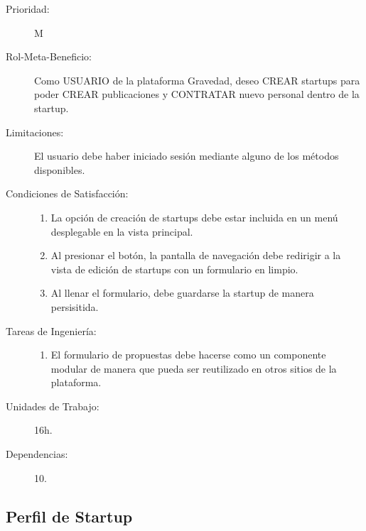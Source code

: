 \begin{description}
    \item[Prioridad:] M
    \item[Rol-Meta-Beneficio:]  Como USUARIO de la plataforma Gravedad, deseo CREAR startups para poder CREAR publicaciones y CONTRATAR nuevo personal dentro de la startup.
    \item[Limitaciones:]  El usuario debe haber iniciado sesión mediante alguno de los métodos disponibles.
    \item[Condiciones de Satisfacción:]  \hfill
        \begin{enumerate}
            \item La opción de creación de startups debe estar incluida en un menú desplegable en la vista principal.
    		\item Al presionar el botón, la pantalla de navegación debe redirigir a la vista de edición de startups con un formulario en limpio.
    		\item Al llenar el formulario, debe guardarse la startup de manera persisitida.
        \end{enumerate}
    \item[Tareas de Ingeniería:]  \hfill
        \begin{enumerate}
            \item El formulario de propuestas debe hacerse como un componente modular de manera que pueda ser reutilizado en otros sitios de la plataforma.
        \end{enumerate}
    \item[Unidades de Trabajo:] 16h.
    \item[Dependencias:] 10.
\end{description}

\newpage

\subsection{Perfil de Startup}

